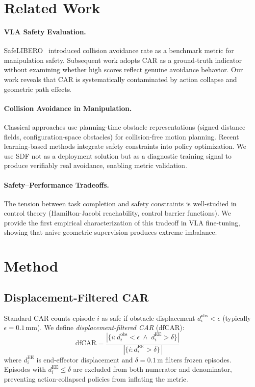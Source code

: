 \documentclass[10pt,twocolumn]{article}
\begin{document}
\section{Related Work}

\paragraph{VLA Safety Evaluation.}
SafeLIBERO~\cite{safelibero} introduced collision avoidance rate as a benchmark metric for manipulation safety. Subsequent work adopts CAR as a ground-truth indicator without examining whether high scores reflect genuine avoidance behavior. Our work reveals that CAR is systematically contaminated by action collapse and geometric path effects.

\paragraph{Collision Avoidance in Manipulation.}
Classical approaches use planning-time obstacle representations (signed distance fields, configuration-space obstacles) for collision-free motion planning. Recent learning-based methods integrate safety constraints into policy optimization. We use SDF not as a deployment solution but as a diagnostic training signal to produce verifiably real avoidance, enabling metric validation.

\paragraph{Safety--Performance Tradeoffs.}
The tension between task completion and safety constraints is well-studied in control theory (Hamilton-Jacobi reachability, control barrier functions). We provide the first empirical characterization of this tradeoff in VLA fine-tuning, showing that naive geometric supervision produces extreme imbalance.

\section{Method}
\label{sec:method}

\subsection{Displacement-Filtered CAR}

Standard CAR counts episode $i$ as safe if obstacle displacement $d_i^{\text{obs}} < \epsilon$ (typically $\epsilon = 0.1$\,mm). We define \emph{displacement-filtered CAR} (dfCAR):
\begin{equation}
    \text{dfCAR} = \frac{|\{i : d_i^{\text{obs}} < \epsilon \;\wedge\; d_i^{\text{EE}} > \delta\}|}{|\{i : d_i^{\text{EE}} > \delta\}|}
\end{equation}
where $d_i^{\text{EE}}$ is end-effector displacement and $\delta = 0.1$\,m filters frozen episodes. Episodes with $d_i^{\text{EE}} \leq \delta$ are excluded from both numerator and denominator, preventing action-collapsed policies from inflating the metric.
\end{document}
